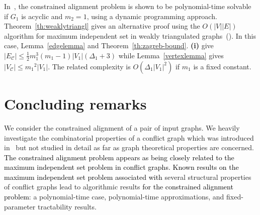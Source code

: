 \documentclass[final]{dmtcs-episciences}
\newcommand\mar[1]{\textcolor{black}{#1}}
\begin{document}
In~\citet{AbakaBE13}, the constrained alignment
problem is shown to be polynomial-time solvable  if $G_1$ is acyclic and $m_2=1$, using a dynamic programming approach. Theorem~\ref{th:weaklytriangl} gives an alternative proof using the $O(|V||E|)$ algorithm for maximum independent set in weakly triangulated graphs~(\citet{hayward2}). In this case, 
 Lemma~\ref{edgelemma} and Theorem~\ref{th:zagreb-bound}.\textbf{ (i)} give  $|E_\mathcal{C}|\leq \frac{1}{2}m_1^3(m_1-1)|V_1|(\Delta_1+3)$  while Lemma~\ref{vertexlemma} gives $|V_\mathcal{C}|\leq {m_1}^2 |V_1|$.
 The related complexity is $O(\Delta_1|V_1|^2)$ if $m_1$ is a fixed constant. 



\section{Concluding remarks}\label{sec:conclude}

We consider the constrained alignment of a pair of input graphs. 
We heavily investigate the combinatorial properties of a conflict graph 
which was introduced in~\citet{Fertin200990} but not studied in detail as far 
as graph theoretical properties are concerned. \mar{The constrained alignment problem appears as being closely related to the maximum independent set problem in conflict graphs.}
\mar{Known results on the maximum independent set problem associated with} several structural properties of conflict graphs lead to algorithmic results \mar{for the constrained alignment problem}: a polynomial-time  case, polynomial-time
approximations, and fixed-parameter tractability results.  
\end{document}
